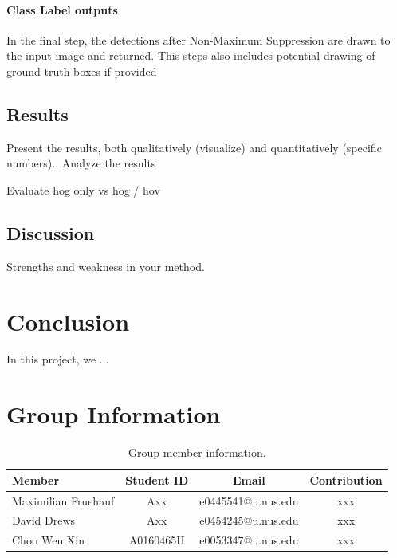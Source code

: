 \documentclass[11pt]{article}
\begin{document}
\paragraph{Class Label outputs}
In the final step, the detections after Non-Maximum Suppression are drawn to the input image and returned. 
This steps also includes potential drawing of ground truth boxes if provided

\subsection{Results}\label{subsec:results}
Present the results, both qualitatively (visualize) and quantitatively (specific numbers)..
Analyze the results

Evaluate hog only vs hog / hov
\subsection{Discussion}
Strengths and weakness in your method.

\section{Conclusion}
In this project, we ...

\section{Group Information}
\begin{table}[ht]
    \centering
    \begin{tabular}{lccc}
    \toprule
     Member & Student ID & Email & Contribution\\
    \midrule
    Maximilian Fruehauf& Axx & e0445541@u.nus.edu & xxx \\
    David Drews& Axx &e0454245@u.nus.edu & xxx  \\
    Choo Wen Xin& A0160465H & e0053347@u.nus.edu & xxx  \\
    \bottomrule
    \end{tabular}
    \caption{Group member information.}
    \label{tab:dataset}
\end{table}




 
\end{document}
